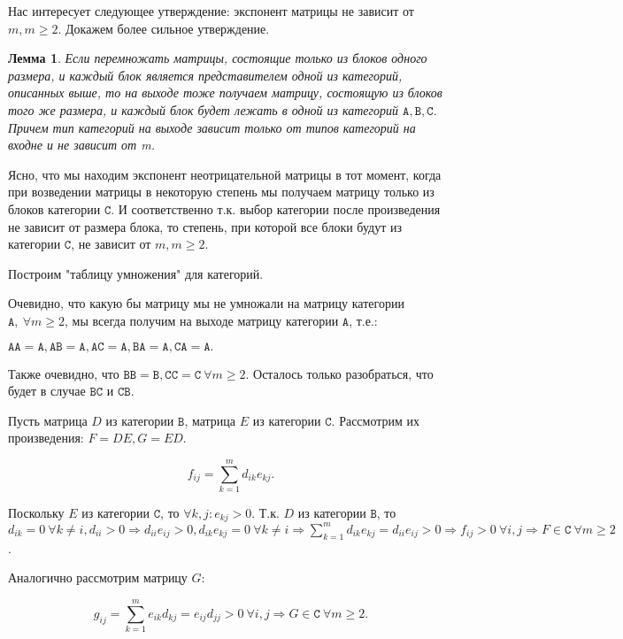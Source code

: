 \documentclass[a4paper,12pt]{report}
\theoremstyle{plain} %
\newtheorem{Lemma}{Лемма}[chapter]
\theoremstyle{definition}
\theoremstyle{remark}
\begin{document}
\begin{large}
Нас интересует следующее утверждение: экспонент матрицы не зависит от $m, m \geq 2$. Докажем более сильное утверждение.

\begin{Lemma}
Если перемножать матрицы, состоящие только из блоков одного размера, и каждый блок является представителем одной из категорий, описанных выше, то на выходе тоже получаем матрицу, состоящую из блоков того же размера, и каждый блок будет лежать в одной из категорий $\texttt{A},\texttt{B},\texttt{C}$. Причем тип категорий на выходе зависит только от типов категорий на входне и не зависит от m.
\end{Lemma}
Ясно, что мы находим экспонент неотрицательной матрицы в тот момент, когда при возведении матрицы в некоторую степень мы получаем матрицу только из блоков категории $\texttt{C}$. И соответственно т.к. выбор категории после произведения не зависит от размера блока, то степень, при которой все блоки будут из категории $\texttt{C}$, не зависит от $m, m \geq 2$.

Построим "таблицу умножения" для категорий.

Очевидно, что какую бы матрицу мы не умножали на матрицу категории $\texttt{A}, ~\forall m \geq 2$, мы всегда получим на выходе матрицу категории $\texttt{A}$, т.е.:

$\texttt{A}\texttt{A} = \texttt{A}, \texttt{A}\texttt{B} = \texttt{A}, \texttt{A}\texttt{C} = \texttt{A}, \texttt{B}\texttt{A} = \texttt{A}, \texttt{C}\texttt{A} = \texttt{A}.$

Также очевидно, что $\texttt{B}\texttt{B} = \texttt{B}, \texttt{C}\texttt{C} = \texttt{C} ~\forall m \geq 2$. Осталось только разобраться, что будет в случае $\texttt{B}\texttt{C}$ и $\texttt{C}\texttt{B}$.

Пусть матрица $D$ из категории $\texttt{B}$, матрица $E$ из категории $\texttt{C}$. Рассмотрим их произведения: $F = DE, G = ED$.

$$f_{ij} = \sum_{k=1}^m d_{ik}e_{kj}.$$

Поскольку $E$ из категории $\texttt{C}$, то $\forall k,j: e_{kj} > 0$. Т.к. $D$ из категории $\texttt{B}$, то $d_{ik} = 0~ \forall k \neq i, d_{ii} > 0 \Rightarrow d_{ii}e_{ij} > 0, d_{ik}e_{kj} = 0~ \forall k \neq i \Rightarrow \sum_{k=1}^m d_{ik}e_{kj} = d_{ii}e_{ij} > 0 \Rightarrow f_{ij} > 0~ \forall i,j \Rightarrow F \in \texttt{C} ~\forall m \geq 2$.

Аналогично рассмотрим матрицу $G$:

$$g_{ij} = \sum_{k=1}^m e_{ik}d_{kj} = e_{ij}d_{jj} > 0 ~\forall i,j \Rightarrow G \in \texttt{C} ~\forall m \geq 2.$$


\end{large}
\end{document}
